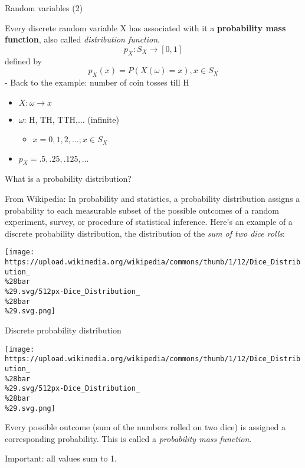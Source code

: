 \begin{frame}{Random variables (2)}

Every discrete random variable X has associated with it a
\textbf{probability mass function}, also called \emph{distribution
function}. \[
\begin{equation}
p_X : S_X \rightarrow [0, 1] 
\end{equation}
\] defined by \[
\begin{equation}
p_X(x) = P(X(\omega) = x), x \in S_X
 \end{equation}
\] - Back to the example: number of coin tosses till H

\begin{itemize}
\itemsep1pt\parskip0pt
\item
  \(X: \omega \rightarrow x\)
\item
  \(\omega\): H, TH, TTH,\(\dots\) (infinite)

  \begin{itemize}
  \itemsep1pt\parskip0pt
  \item
    \(x=0,1,2,\dots; x \in S_X\)
  \end{itemize}
\item
  \(p_X = .5, .25, .125,\dots\)
\end{itemize}

\end{frame}

\begin{frame}{What is a probability distribution?}

From Wikipedia: In probability and statistics, a probability
distribution assigns a probability to each measurable subset of the
possible outcomes of a random experiment, survey, or procedure of
statistical inference. Here's an example of a discrete probability
distribution, the distribution of the \emph{sum of two dice rolls}:

\texttt{[image: https://upload.wikimedia.org/wikipedia/commons/thumb/1/12/Dice\_Distribution\_\\\%28bar\\\%29.svg/512px-Dice\_Distribution\_\\\%28bar\\\%29.svg.png]}

\end{frame}

\begin{frame}{Discrete probability distribution}

\texttt{[image: https://upload.wikimedia.org/wikipedia/commons/thumb/1/12/Dice\_Distribution\_\\\%28bar\\\%29.svg/512px-Dice\_Distribution\_\\\%28bar\\\%29.svg.png]}

Every possible outcome (sum of the numbers rolled on two dice) is
assigned a corresponding probability. This is called a \emph{probability
mass function}.

Important: all values sum to 1.

\end{frame}

